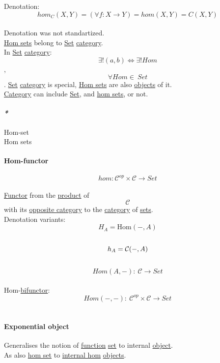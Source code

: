 \documentclass[11pt]{article}
\begin{document}
Denotation:\\
$$ hom_{C}(X,Y) = (\forall f: X \to Y) = hom(X,Y) = C(X,Y) $$\\
Denotation was not standartized.\\

\hyperref[orgf543969]{Hom sets} belong to \hyperref[orgbed80ba]{Set} \hyperref[org3e3a79b]{category}.\\

In \hyperref[orgbed80ba]{Set} \hyperref[org3e3a79b]{category}: $$ \exists! (a, b) \iff \exists! Hom $$, $$ \forall Hom \in \ Set $$. \hyperref[orgbed80ba]{Set} \hyperref[org3e3a79b]{category} is special, \hyperref[orgf543969]{Hom sets} are also \hyperref[orge0f000f]{objects} of it.\\

\hyperref[org3e3a79b]{Category} can include \hyperref[orgbed80ba]{Set}, and \hyperref[orgf543969]{hom sets}, or not.\\

\paragraph{\emph{*}}
\label{sec:org0bf9a52}
\label{org5d9c7e0}Hom-set\\
\label{orgf543969}Hom sets\\

\paragraph{\label{orgfc8b381}Hom-functor}
\label{sec:org06f807f}
$$ hom:\mathcal{C}^{op} \times \mathcal{C} \to Set $$\\
\hyperref[org6073683]{Functor} from the \hyperref[orga3d1454]{product} of $$ \mathcal{C} $$ with its \hyperref[org97c2d69]{opposite category} to the \hyperref[org3e3a79b]{category} of \hyperref[org4e7443a]{sets}.\\

Denotation variants:\\
$$ H_A = \mathrm{Hom}(-, A) $$\\
$$ h_A = {\cal \mathcal{C}}(-, A) $$\\
$$ Hom(A,-): \ \mathcal{C} \to Set $$\\

Hom-\hyperref[org459acb0]{bifunctor}:\\
$$ Hom(-,-): \ \mathcal{C}^{op} \times \mathcal{C} \to Set $$\\

\paragraph{\label{orgd85401a}Exponential object}
\label{sec:orgd899ee6}
Generalises the notion of \hyperref[orgeb5cddb]{function} \hyperref[orgbed80ba]{set} to internal \hyperref[org025aac8]{object}.\\
As also \hyperref[org2ab6a0f]{hom set} to \hyperref[org4df168b]{internal hom} \hyperref[orge0f000f]{objects}.\\
\end{document}
